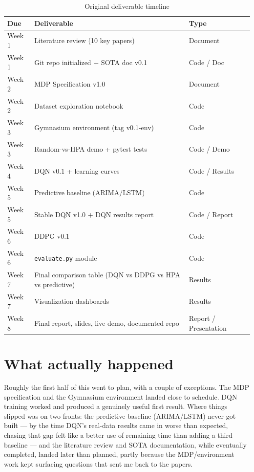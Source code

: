 \documentclass{rapportINPTCLOUD}
\begin{document}
\begin{table}[h]
\centering
\begin{tabularx}{\textwidth}{lXl}
\toprule
\textbf{Due} & \textbf{Deliverable} & \textbf{Type} \\
\midrule
Week 1 & Literature review (10 key papers) & Document \\
Week 1 & Git repo initialized + SOTA doc v0.1 & Code / Doc \\
Week 2 & MDP Specification v1.0 & Document \\
Week 2 & Dataset exploration notebook & Code \\
Week 3 & Gymnasium environment (tag v0.1-env) & Code \\
Week 3 & Random-vs-HPA demo + pytest tests & Code / Demo \\
Week 4 & DQN v0.1 + learning curves & Code / Results \\
Week 5 & Predictive baseline (ARIMA/LSTM) & Code \\
Week 5 & Stable DQN v1.0 + DQN results report & Code / Report \\
Week 6 & DDPG v0.1 & Code \\
Week 6 & \texttt{evaluate.py} module & Code \\
Week 7 & Final comparison table (DQN vs DDPG vs HPA vs predictive) & Results \\
Week 7 & Visualization dashboards & Results \\
Week 8 & Final report, slides, live demo, documented repo & Report / Presentation \\
\bottomrule
\end{tabularx}
\caption{Original deliverable timeline}
\label{tab:timeline}
\end{table}

\section{What actually happened}

Roughly the first half of this went to plan, with a couple of exceptions. The MDP specification and the Gymnasium environment landed close to schedule. DQN training worked and produced a genuinely useful first result. Where things slipped was on two fronts: the predictive baseline (ARIMA/LSTM) never got built — by the time DQN's real-data results came in worse than expected, chasing that gap felt like a better use of remaining time than adding a third baseline — and the literature review and SOTA documentation, while eventually completed, landed later than planned, partly because the MDP/environment work kept surfacing questions that sent me back to the papers.
\end{document}
